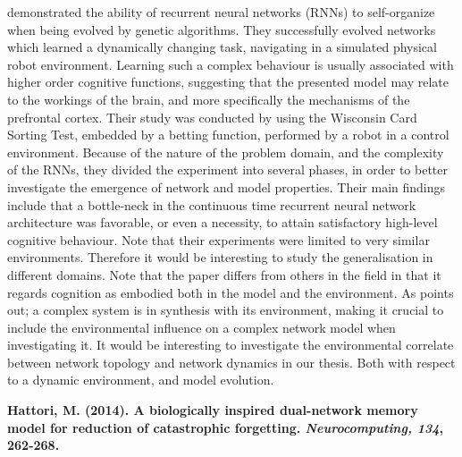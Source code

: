\cite{Maniadakis2012} demonstrated the ability of recurrent neural networks (RNNs) to self-organize when being evolved by genetic algorithms. They successfully evolved networks which learned a dynamically changing task, navigating in a simulated physical robot environment. Learning such a complex behaviour is usually associated with higher order cognitive functions, suggesting that the presented model may relate to the workings of the brain, and more specifically the mechanisms of the prefrontal cortex.
Their study was conducted by using the Wisconsin Card Sorting Test, embedded by a betting function, performed by a robot in a control environment. Because of the nature of the problem domain, and the complexity of the RNNs, they divided the experiment into several phases, in order to better investigate the emergence of network and model properties. Their main findings include that a bottle-neck in the continuous time recurrent neural network architecture was favorable, or even a necessity, to attain satisfactory high-level cognitive behaviour. Note that their experiments were limited to very similar environments. Therefore it would be interesting to study the generalisation in different domains. Note that the paper differs from others in the field in that it regards cognition as embodied both in the model and the environment. As \cite{Bar-yam1997} points out; a complex system is in synthesis with its environment, making it crucial to include the environmental influence on a complex network model when investigating it. It would be interesting to investigate the environmental correlate between network topology and network dynamics in our thesis. Both with respect to a dynamic environment, and model evolution.


\textbf{Hattori, M. (2014). A biologically inspired dual-network memory model for reduction of catastrophic forgetting. \textit{Neurocomputing, 134}, 262-268.}


